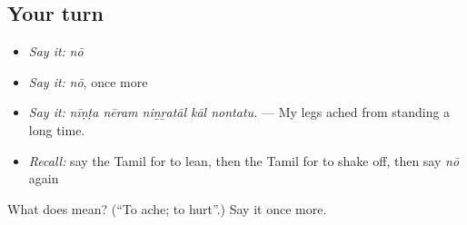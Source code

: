\subsection*{Your turn}
\begin{itemize}
\raggedright
  \item \emph{Say it:} \emph{nō}
  \item \emph{Say it:} \emph{nō}, once more
  \item \emph{Say it:} \emph{nīṇṭa nēram niṉṟatāl kāl nontatu.} — My legs ached from standing a long time.
  \item \emph{Recall:} say the Tamil for to lean, then the Tamil for to shake off, then say \emph{nō} again
\end{itemize}

\begin{tcolorbox}[breakable,colback=teal!4,colframe=teal!35!black,title={Before you move on}]
What does  mean? (\textquotedblleft{}To ache; to hurt\textquotedblright{}.) Say it once more.
\end{tcolorbox}
